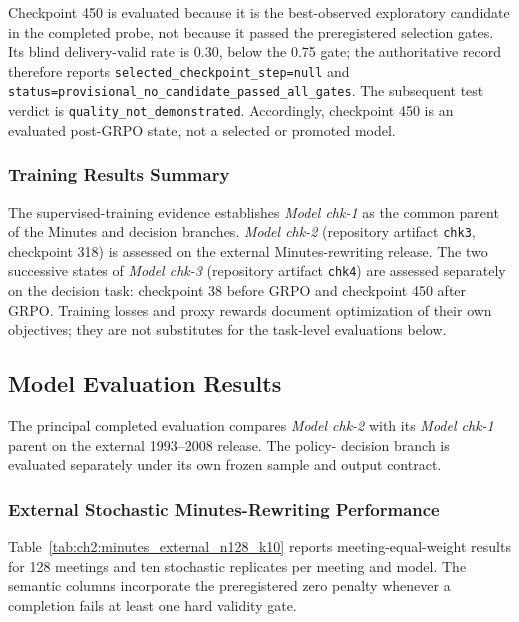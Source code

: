 Checkpoint 450 is evaluated because it is the best-observed exploratory
candidate in the completed probe, not because it passed the preregistered
selection gates. Its blind delivery-valid rate is 0.30, below the 0.75 gate;
the authoritative record therefore reports
\texttt{selected\_checkpoint\_step=null} and
\texttt{status=provisional\_no\_candidate\_passed\_all\_gates}. The subsequent
test verdict is \texttt{quality\_not\_demonstrated}. Accordingly, checkpoint
450 is an evaluated post-GRPO state, not a selected or promoted model.






\subsubsection*{Training Results Summary}

The supervised-training evidence establishes \textit{Model chk-1} as the
common parent of the Minutes and decision branches. \textit{Model chk-2}
(repository artifact \texttt{chk3}, checkpoint 318) is assessed on the external
Minutes-rewriting release. The two successive states of \textit{Model chk-3}
(repository artifact \texttt{chk4}) are assessed separately on the decision
task: checkpoint 38 before GRPO and checkpoint 450 after GRPO. Training losses
and proxy rewards document optimization of their own objectives; they are not
substitutes for the task-level evaluations below.






\subsection*{Model Evaluation Results}

The principal completed evaluation compares \textit{Model chk-2} with its
\textit{Model chk-1} parent on the external 1993--2008 release. The policy-
decision branch is evaluated separately under its own frozen sample and output
contract.

\subsubsection*{External Stochastic Minutes-Rewriting Performance}

Table~\ref{tab:ch2:minutes_external_n128_k10} reports meeting-equal-weight
results for 128 meetings and ten stochastic replicates per meeting and model.
The semantic columns incorporate the preregistered zero penalty whenever a
completion fails at least one hard validity gate.

